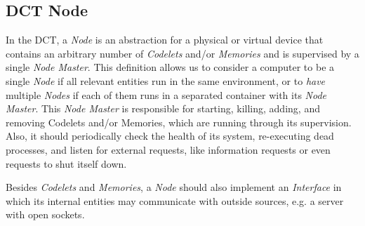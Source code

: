 \subsection{DCT Node}
\label{sec:dct_node}

In the DCT, a \emph{Node} is an abstraction for a physical or virtual device that contains an arbitrary number of \emph{Codelets} and/or \emph{Memories} and is supervised by a single \emph{Node Master}. This definition allows us to consider a computer to be a single \emph{Node} if all relevant entities run in the same environment, or to \textit{have} multiple \emph{Nodes} if each of them runs in a separated container with its \emph{Node Master}.
This \emph{Node Master} is responsible for starting, killing, adding, and removing Codelets and/or Memories, which are running through its supervision. Also, it should periodically check the health of its system, re-executing dead processes, and listen for external requests, like information requests or even requests to shut itself down.

Besides \emph{Codelets} and \emph{Memories}, a \emph{Node} should also implement an \emph{Interface} in which its internal entities may communicate with outside sources, e.g. a server with open sockets.

